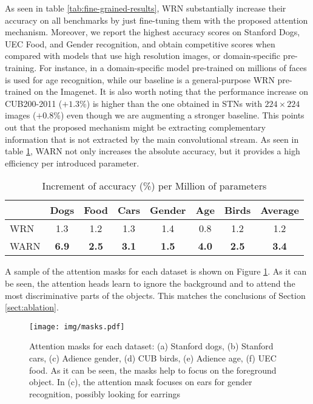 \documentclass[runningheads]{llncs}
\begin{document}
As seen in table \ref{tab:fine-grained-results}, WRN substantially increase their accuracy on all benchmarks by just fine-tuning them with the proposed attention mechanism. Moreover, we report the highest accuracy scores on Stanford Dogs, UEC Food, and Gender recognition, and obtain competitive scores when compared with models that use high resolution images, or domain-specific pre-training. For instance, in \cite{Rothe-IJCV-2016} a domain-specific model pre-trained on millions of faces is used for age recognition, while our baseline is a general-purpose WRN pre-trained on the Imagenet. It is also worth noting that the performance increase on CUB200-2011 ($+1.3\%$) is higher than the one obtained in STNs with $224\times 224$ images ($+0.8\%$) even though we are augmenting a stronger baseline. This points out that the proposed mechanism might be extracting complementary information that is not extracted by the main convolutional stream. As seen in table \ref{tab:acc_param}, WARN not only increases the absolute accuracy, but it provides a high efficiency per introduced parameter.

\begin{table}[t!]
\centering
\caption{Increment of accuracy (\%) per Million of parameters}
\label{tab:acc_param}
\begin{tabular}{@{}lccccccc@{}}
\toprule
\textbf{} & \textbf{Dogs} & \textbf{Food} & \textbf{Cars} & \textbf{Gender} & \textbf{Age} & \textbf{Birds} & \textbf{Average} \\ \midrule
WRN & 1.3 & 1.2 & 1.3 & 1.4 & 0.8 & 1.2 & 1.2 \\
WARN & \textbf{6.9} & \textbf{2.5} & \textbf{3.1} & \textbf{1.5} & \textbf{4.0} & \textbf{2.5} & \textbf{3.4} \\ \bottomrule
\end{tabular}
\end{table}

A sample of the attention masks for each dataset is shown on Figure \ref{fig:attention_masks}. As it can be seen, the attention heads learn to ignore the background and to attend the most discriminative parts of the objects. This matches the conclusions of Section \ref{sect:ablation}.

\begin{figure}[t!]
\centering
\texttt{[image: img/masks.pdf]}
\caption{Attention masks for each dataset: (a) Stanford dogs, (b) Stanford cars, (c) Adience gender, (d) CUB birds, (e) Adience age, (f) UEC food. As it can be seen, the masks help to focus on the foreground object. In (c), the attention mask focuses on ears for gender recognition, possibly looking for earrings }
\label{fig:attention_masks}
\end{figure}
\end{document}
